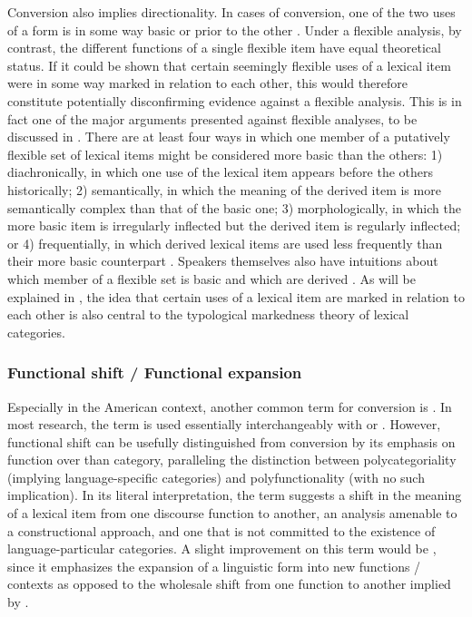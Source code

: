 Conversion also implies directionality. In cases of conversion, one of the two uses of a form is in some way basic or prior to the other \parencites[156]{Mithun2017}[5]{VapnarskyVeneziano2017a}. Under a flexible analysis, by contrast, the different functions of a single flexible item have equal theoretical status. If it could be shown that certain seemingly flexible uses of a lexical item were in some way marked in relation to each other, this would therefore constitute potentially disconfirming evidence against a flexible analysis. This is in fact one of the major arguments presented against flexible analyses, to be discussed in . There are at least four ways in which one member of a putatively flexible set of lexical items might be considered more basic than the others: 1) diachronically, in which one use of the lexical item appears before the others historically; 2) semantically, in which the meaning of the derived item is more semantically complex than that of the basic one; 3) morphologically, in which the more basic item is irregularly inflected but the derived item is regularly inflected; or 4) frequentially, in which derived lexical items are used less frequently than their more basic counterpart \parencite[108--111]{Plag2003}. Speakers themselves also have intuitions about which member of a flexible set is basic and which are derived \parencite[166]{Mithun2017}. As will be explained in , the idea that certain uses of a lexical item are marked in relation to each other is also central to the typological markedness theory of lexical categories.

\subsubsection{Functional shift / Functional expansion}
\label{sec:2.3.1.8}

Especially in the American context, another common term for conversion is  \parencite{Cannon1985}. In most research, the term is used essentially interchangeably with  or . However, functional shift can be usefully distinguished from conversion by its emphasis on function over than category, paralleling the distinction between polycategoriality (implying language-specific categories) and polyfunctionality (with no such implication). In its literal interpretation, the term suggests a shift in the meaning of a lexical item from one discourse function to another, an analysis amenable to a constructional approach, and one that is not committed to the existence of language-particular categories. A slight improvement on this term would be , since it emphasizes the expansion of a linguistic form into new functions / contexts as opposed to the wholesale shift from one function to another implied by .

